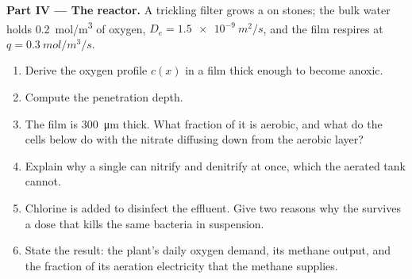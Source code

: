 \begin{problem}
\medskip
\noindent\textbf{Part IV --- The  reactor.}
A trickling filter grows a  on stones; the bulk water holds
\qty{0.2}{mol/m^3} of oxygen, $D_e = \qty{1.5e-9}{m^2/s}$, and the
film respires at $q = \qty{0.3}{mol/m^3/s}$.
\begin{enumerate}[resume]
  \item Derive the oxygen profile $c(x)$ in a film thick enough to
        become anoxic.
  \item Compute the penetration depth.
  \item The film is \qty{300}{\micro m} thick. What fraction of it is
        aerobic, and what do the cells below do with the nitrate
        diffusing down from the aerobic layer?
  \item Explain why a single  can nitrify and denitrify at
        once, which the aerated tank cannot.
  \item Chlorine is added to disinfect the effluent. Give two reasons
        why the  survives a dose that kills the same bacteria
        in suspension.
  \item State the result: the plant's daily oxygen demand, its methane
        output, and the fraction of its aeration electricity that the
        methane supplies.
\end{enumerate}
\end{problem}
